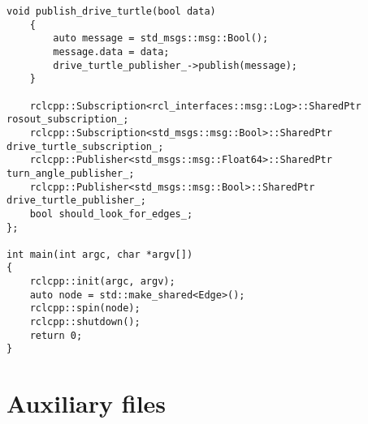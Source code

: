 \begin{lstlisting}[caption={\texttt{/edge} source code}, label={lst:edge_source_code}]
    void publish_drive_turtle(bool data)
    {
        auto message = std_msgs::msg::Bool();
        message.data = data;
        drive_turtle_publisher_->publish(message);
    }

    rclcpp::Subscription<rcl_interfaces::msg::Log>::SharedPtr rosout_subscription_;
    rclcpp::Subscription<std_msgs::msg::Bool>::SharedPtr drive_turtle_subscription_;
    rclcpp::Publisher<std_msgs::msg::Float64>::SharedPtr turn_angle_publisher_;
    rclcpp::Publisher<std_msgs::msg::Bool>::SharedPtr drive_turtle_publisher_;
    bool should_look_for_edges_;
};

int main(int argc, char *argv[])
{
    rclcpp::init(argc, argv);
    auto node = std::make_shared<Edge>();
    rclcpp::spin(node);
    rclcpp::shutdown();
    return 0;
}
\end{lstlisting}



\chapter{Auxiliary files}
\label{chapter:aux_files}


